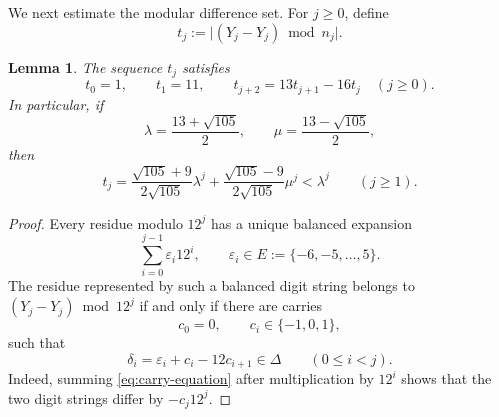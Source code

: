 \documentclass[11pt,reqno]{amsart}
\theoremstyle{plain}
\newtheorem{lemma}[theorem]{Lemma}
\theoremstyle{definition}
\theoremstyle{remark}
\theoremstyle{named}
\newcommand{\card}[1]{\lvert #1\rvert}
\begin{document}
We next estimate the modular difference set. For \(j\ge0\), define
\[
 t_j:=\card{(Y_j-Y_j)\bmod n_j}.
\]

\begin{lemma}\label{lem:difference-recurrence}
The sequence $t_j$ satisfies
\[
 t_0=1,\qquad t_1=11,
 \qquad
 t_{j+2}=13t_{j+1}-16t_j\quad(j\ge0).
\]
In particular, if
\[
 \lambda=\frac{13+\sqrt{105}}2,
 \qquad
 \mu=\frac{13-\sqrt{105}}2,
\]
then
\begin{equation}\label{eq:t-closed}
 t_j=
 \frac{\sqrt{105}+9}{2\sqrt{105}}\lambda^j
 +
 \frac{\sqrt{105}-9}{2\sqrt{105}}\mu^j
 <\lambda^j
 \qquad(j\ge1).
\end{equation}
\end{lemma}

\begin{proof}
Every residue modulo $12^j$ has a unique balanced expansion
\[
 \sum_{i=0}^{j-1}\varepsilon_i12^i,
 \qquad
 \varepsilon_i\in E:=\{-6,-5,\ldots,5\}.
\]
The residue represented by such a balanced digit string belongs to
\((Y_j-Y_j)\bmod 12^j\) if and only if there are carries
\[
 c_0=0,
 \qquad
 c_i\in\{-1,0,1\},
\]
such that
\begin{equation}\label{eq:carry-equation}
 \delta_i=\varepsilon_i+c_i-12c_{i+1}\in\Delta
 \qquad(0\le i<j).
\end{equation}
Indeed, summing \eqref{eq:carry-equation} after multiplication by $12^i$
shows that the two digit strings differ by $-c_j12^j$.


\end{proof}
\end{document}
